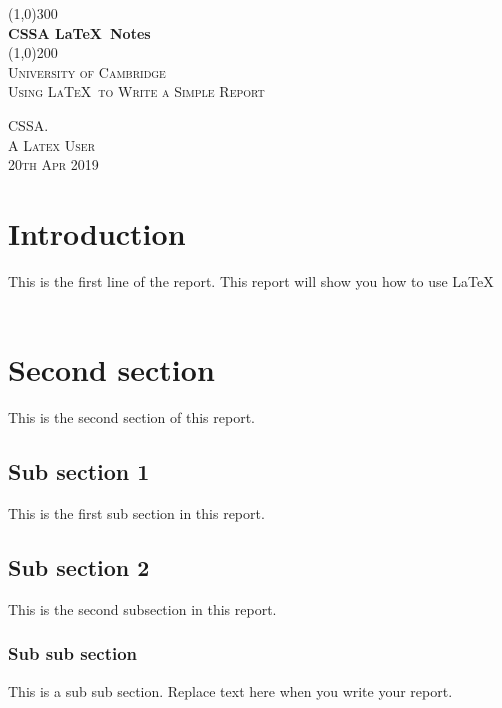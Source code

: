 \documentclass{article}
\begin{document}
\begin{titlepage}
	\begin{center}
		\line(1,0){300}\\
		[0.25in]
		\huge{\textbf{ CSSA \LaTeX\ Notes}}\\
		[2mm]
		\line(1,0){200}\\
		[1.5cm]
		\textsc{\LARGE University of Cambridge}\\
		\textsc{\LARGE Using \LaTeX\ to Write a Simple Report}\\
		[8cm]
	\end{center}
	\begin{flushright}
		\textsc{\large CSSA. \\ A Latex User\\
		20th Apr 2019}
	\end{flushright}
\end{titlepage}
\cleardoublepage
\tableofcontents
\listoffigures
\listoftables

\thispagestyle{empty}
\cleardoublepage

\setcounter{page}{1}

\cleardoublepage
\section{Introduction} 
This is the first line of the report. This report will show you how to use \LaTeX\\\
\lipsum[1]
\section{Second section}
This is the second section of this report.
\subsection{Sub section 1} 
This is the first sub section in this report.
\subsection{Sub section 2} 
This is the second subsection in this report.
\subsubsection{Sub sub section}
This is a sub sub section. Replace text here when you write your report.
\cleardoublepage
\end{document}
